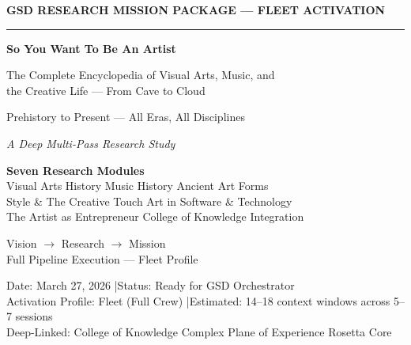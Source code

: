 \documentclass[11pt,letterpaper]{article}
\begin{document}
\thispagestyle{empty}
\begin{center}
\vspace*{2.5cm}

{\small\sffamily\textcolor{primary}{\textbf{GSD RESEARCH MISSION PACKAGE --- FLEET ACTIVATION}}}

\vspace{0.3cm}
\textcolor{bordergray}{\rule{8cm}{0.4pt}}

\vspace{1.5cm}
{\fontsize{26}{32}\selectfont\bfseries\sffamily\textcolor{primary}{So You Want To Be An Artist}}

\vspace{0.4cm}
{\fontsize{16}{20}\selectfont\sffamily\textcolor{secondary}{The Complete Encyclopedia of Visual Arts, Music, and\\[0.2em] the Creative Life --- From Cave to Cloud}}

\vspace{0.6cm}
{\Large\sffamily\textcolor{tertiary}{Prehistory to Present --- All Eras, All Disciplines}}

\vspace{0.4cm}
{\large\sffamily\itshape\textcolor{accent}{A Deep Multi-Pass Research Study}}

\vspace{2.5cm}

\begin{tcolorbox}[colback=lightprimary, colframe=primary, arc=2pt, width=10cm,
  boxrule=0.5pt, left=8pt, right=8pt, top=6pt, bottom=6pt]
\centering\sffamily\small\textcolor{primary}{
\textbf{Seven Research Modules} \\[0.3em]
Visual Arts History \textbullet{} Music History \textbullet{} Ancient Art Forms \\
Style \& The Creative Touch \textbullet{} Art in Software \& Technology \\
The Artist as Entrepreneur \textbullet{} College of Knowledge Integration
}
\end{tcolorbox}

\vspace{2cm}
{\sffamily\textcolor{accent}{Vision $\rightarrow$ Research $\rightarrow$ Mission}}\\[0.3em]
{\small\sffamily\textcolor{accent}{Full Pipeline Execution --- Fleet Profile}}

\vspace{2cm}
{\small\sffamily\textcolor{subtlegray}{Date: March 27, 2026 \quad|\quad Status: Ready for GSD Orchestrator}}\\[0.3em]
{\small\sffamily\textcolor{subtlegray}{Activation Profile: Fleet (Full Crew) \quad|\quad Estimated: 14--18 context windows across 5--7 sessions}}\\[0.3em]
{\small\sffamily\textcolor{subtlegray}{Deep-Linked: College of Knowledge \textbullet{} Complex Plane of Experience \textbullet{} Rosetta Core}}
\end{center}
\newpage
\end{document}
